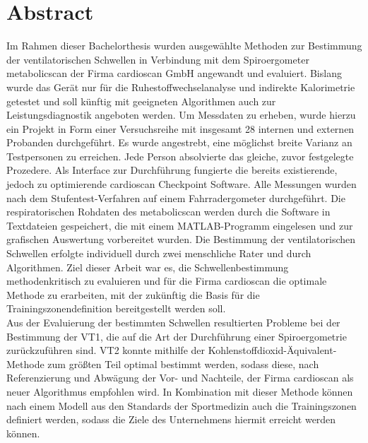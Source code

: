 \chapter*{Abstract}

Im Rahmen dieser Bachelorthesis wurden ausgewählte Methoden zur Bestimmung der ventilatorischen Schwellen in Verbindung mit dem Spiroergometer metabolicscan der Firma cardioscan GmbH angewandt und evaluiert. Bislang wurde das Gerät nur für die Ruhestoffwechselanalyse und indirekte Kalorimetrie getestet und soll künftig mit geeigneten Algorithmen auch zur Leistungsdiagnostik angeboten werden. Um Messdaten zu erheben, wurde hierzu ein Projekt in Form einer Versuchsreihe mit insgesamt 28 internen und externen Probanden durchgeführt. Es wurde angestrebt, eine möglichst breite Varianz an Testpersonen zu erreichen. Jede Person absolvierte das gleiche, zuvor festgelegte Prozedere. Als Interface zur Durchführung fungierte die bereits existierende, jedoch zu optimierende cardioscan Checkpoint Software. Alle Messungen wurden nach dem Stufentest-Verfahren auf einem Fahrradergometer durchgeführt. Die respiratorischen Rohdaten des metabolicscan werden durch die Software in Textdateien gespeichert, die mit einem MATLAB-Programm eingelesen und zur grafischen Auswertung vorbereitet wurden. Die Bestimmung der ventilatorischen Schwellen erfolgte individuell durch zwei menschliche Rater und durch Algorithmen. Ziel dieser Arbeit war es, die Schwellenbestimmung methodenkritisch zu evaluieren und für die Firma cardioscan die optimale Methode zu erarbeiten, mit der zukünftig die Basis für die Trainingszonendefinition bereitgestellt werden soll.\\
Aus der Evaluierung der bestimmten Schwellen resultierten Probleme bei der Bestimmung der VT1, die auf die Art der Durchführung einer Spiroergometrie zurückzuführen sind. VT2 konnte mithilfe der Kohlenstoffdioxid-Äquivalent-Methode zum größten Teil optimal bestimmt werden, sodass diese, nach Referenzierung und Abwägung der Vor- und Nachteile, der Firma cardioscan als neuer Algorithmus empfohlen wird. In Kombination mit dieser Methode können nach einem Modell aus den Standards der Sportmedizin auch die Trainingszonen definiert werden, sodass die Ziele des Unternehmens hiermit erreicht werden können.
